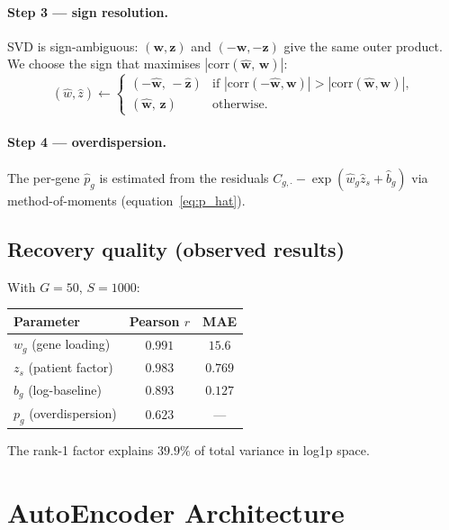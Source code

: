 \documentclass[11pt,a4paper]{article}
\newcommand{\wh}{\hat{w}}
\newcommand{\zh}{\hat{z}}
\theoremstyle{definition}
\begin{document}
\paragraph{Step 3 --- sign resolution.}
SVD is sign-ambiguous: $(\bm{w}, \bm{z})$ and $(-\bm{w}, -\bm{z})$ give
the same outer product.  We choose the sign that maximises
$|\text{corr}(\hat{\bm{w}},\, \bm{w})|$:
\begin{equation}
  (\wh, \zh) \leftarrow
    \begin{cases}
      (-\hat{\bm{w}},\,-\hat{\bm{z}}) & \text{if }
        |\text{corr}(-\hat{\bm{w}},\bm{w})| > |\text{corr}(\hat{\bm{w}},\bm{w})|,\\
      (\hat{\bm{w}},\,\hat{\bm{z}}) & \text{otherwise.}
    \end{cases}
\end{equation}

\paragraph{Step 4 --- overdispersion.}
The per-gene $\hat{p}_g$ is estimated from the residuals
$C_{g,\cdot} - \exp(\hat{w}_g \hat{z}_s + \hat{b}_g)$ via method-of-moments
(equation~\eqref{eq:p_hat}).

\subsection{Recovery quality (observed results)}

With $G = 50$, $S = 1000$:
\begin{center}
\begin{tabular}{lcc}
\toprule
Parameter & Pearson $r$ & MAE\\
\midrule
$w_g$ (gene loading)    & $0.991$ & $15.6$\\
$z_s$ (patient factor)  & $0.983$ & $0.769$\\
$b_g$ (log-baseline)    & $0.893$ & $0.127$\\
$p_g$ (overdispersion)  & $0.623$ & ---\\
\bottomrule
\end{tabular}
\end{center}
The rank-1 factor explains $39.9\%$ of total variance in log1p space.

\section{AutoEncoder Architecture}
\label{sec:ae}
\end{document}
